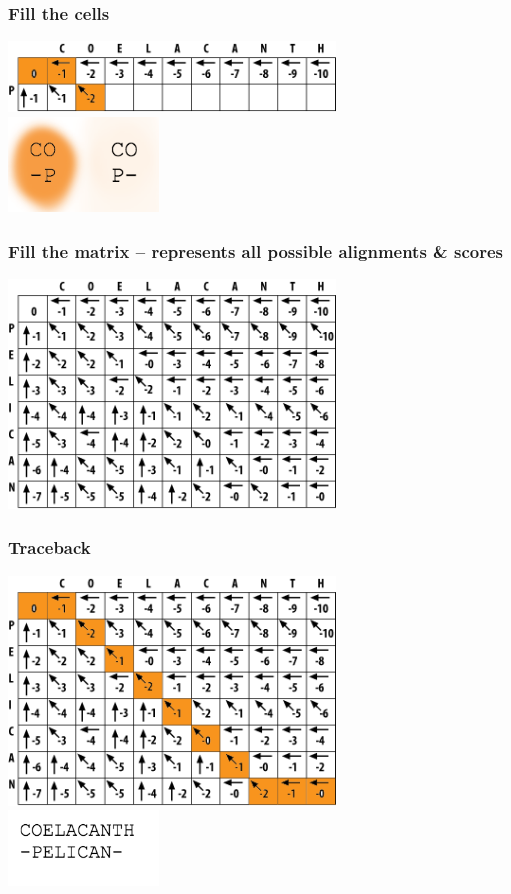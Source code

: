 \begin{frame}
  \frametitle{Fill the cells}
  \begin{center}
    \includegraphics[width=0.65\textwidth]{images/fill_start} \\
    \includegraphics[width=0.3\textwidth]{images/fill_start_letters}
  \end{center}
\end{frame}     

\begin{frame}
  \frametitle{Fill the matrix -- represents all possible alignments \& scores}
  \begin{center}
    \includegraphics[width=0.65\textwidth]{images/full_matrix}
  \end{center}
\end{frame}  
   
\begin{frame}
  \frametitle{Traceback}
  \begin{center}
    \includegraphics[width=0.65\textwidth]{images/traceback} \\
    \includegraphics[width=0.3\textwidth]{images/traceback_sequence}         
  \end{center}
\end{frame}     


